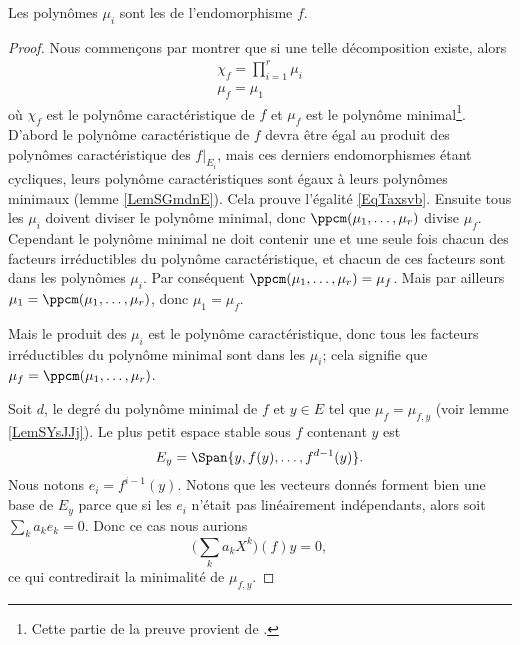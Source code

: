 Les polynômes \( \mu_i\) sont les  de l'endomorphisme \( f\).

\begin{proof}
    Nous commençons par montrer que si une telle décomposition existe, alors
    \begin{subequations}    \label{subEqzcGouz}
        \begin{align}
            \chi_f=\prod_{i=1}^r\mu_i  \label{EqTaxsvb}\\
            \mu_f=\mu_1
        \end{align}
    \end{subequations}
    où \( \chi_f\) est le polynôme caractéristique de \( f\) et \( \mu_f\) est le polynôme minimal\footnote{Cette partie de la preuve provient de \cite{MoncetIVS}.}. D'abord le polynôme caractéristique de \( f\) devra être égal au produit des polynômes caractéristique des \( f|_{E_i}\), mais ces derniers endomorphismes étant cycliques, leurs polynôme caractéristiques sont égaux à leurs polynômes minimaux (lemme \ref{LemSGmdnE}). Cela prouve l'égalité \eqref{EqTaxsvb}. Ensuite tous les \( \mu_i\) doivent diviser le polynôme minimal, donc \( \ppcm(\mu_1,\ldots, \mu_r)\) divise \(\mu_f\). Cependant le polynôme minimal ne doit contenir une et une seule fois chacun des facteurs irréductibles du polynôme caractéristique, et chacun de ces facteurs sont dans les polynômes \( \mu_i\). Par conséquent \( \ppcm(\mu_1,\ldots, \mu_r)=\mu_f\). Mais par ailleurs \( \mu_1=\ppcm(\mu_1,\ldots, \mu_r)\), donc \( \mu_1=\mu_f\).
    
    Mais le produit des \( \mu_i\) est le polynôme caractéristique, donc tous les facteurs irréductibles du polynôme minimal sont dans les \( \mu_i\); cela signifie que \( \mu_f=\ppcm(\mu_1,\ldots, \mu_r)\).

    Soit \( d\), le degré du polynôme minimal de \( f\) et \( y\in E\) tel que \( \mu_f=\mu_{f,y}\) (voir lemme \ref{LemSYsJJj}). Le plus petit espace stable sous \( f\) contenant \( y\) est
    \begin{equation}
        E_y=\Span\{ y,f(y),\ldots, f^{d-1}(y) \}.
    \end{equation}
    Nous notons \( e_i=f^{i-1}(y)\). Notons que les vecteurs donnés forment bien une base de \( E_y\) parce que si les \( e_i\) n'était pas linéairement indépendants, alors soit \( \sum_ka_ke_k=0\). Donc ce cas nous aurions
    \begin{equation}
        \big( \sum_ka_kX^k \big)(f)y=0,
    \end{equation}
    ce qui contredirait la minimalité de \( \mu_{f,y}\).


\end{proof}
